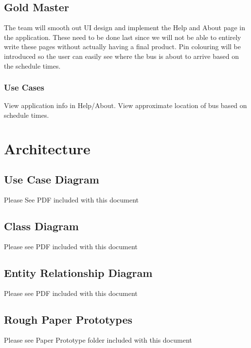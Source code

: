 \documentclass[a4paper,12pt]{article}
\begin{document}
\subsection{Gold Master}
The team will smooth out UI design and implement the Help and About page in the application. These need to be done last since we will not be able to entirely write these pages without actually having a final product. Pin colouring will be introduced so the user can easily see where the bus is about to arrive based on the schedule times.

\subsubsection{Use Cases}
View application info in Help/About.
View approximate location of bus based on schedule times.

\pagebreak
\section{Architecture}
\subsection{Use Case Diagram}
Please See PDF included with this document
\subsection{Class Diagram}
Please see PDF included with this document
\subsection{Entity Relationship Diagram}
Please see PDF included with this document
\subsection{Rough Paper Prototypes}
Please see Paper Prototype folder included with this document

\pagebreak
\end{document}
